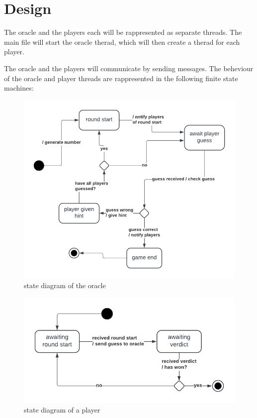 \documentclass[12pt, a4paper]{report}
\begin{document}
\chapter{Design}
The oracle and the players each will be rappresented as separate threads. The main file will start the oracle therad, which will then create a therad for each player.

The oracle and the players will communicate by sending messages. The beheviour of the oracle and player threads are rappresented in the following finite state machines:

\begin{figure}
    \centering
    \includegraphics{oracleSD.png}
    \caption{state diagram of the oracle}
\end{figure}

\begin{figure}
    \centering
    \includegraphics{playerSD.png}
    \caption{state diagram of a player}
\end{figure}
\end{document}
